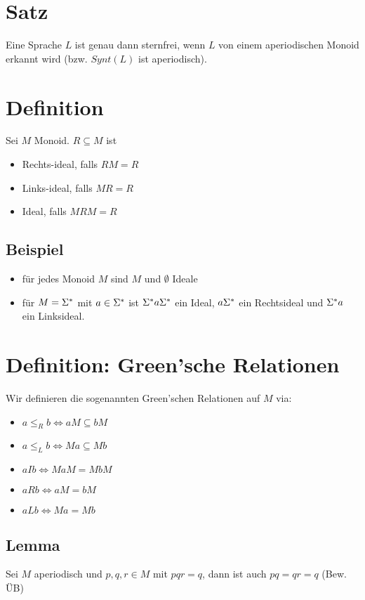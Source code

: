 \section{Satz}
    Eine Sprache $L$ ist genau dann sternfrei, wenn $L$ von einem aperiodischen Monoid erkannt wird (bzw. $Synt(L)$ ist aperiodisch).
\section{Definition}
    Sei $M$ Monoid. $R\subseteq M$ ist
    \begin{itemize}
        \item Rechts-ideal, falls $RM=R$
        \item Links-ideal, falls $MR=R$
        \item Ideal, falls $MRM=R$
    \end{itemize}
    \subsection{Beispiel}
        \begin{itemize}
            \item für jedes Monoid $M$ sind $M$ und $\emptyset$ Ideale
            \item für $M=\Sigma^*$ mit $a\in\Sigma^*$ ist $\Sigma^* a\Sigma^*$ ein Ideal, $a\Sigma^*$ ein Rechtsideal und $\Sigma^* a$ ein Linksideal.
        \end{itemize}
\section{Definition: Green'sche Relationen}
    Wir definieren die sogenannten Green'schen Relationen auf $M$ via:
    \begin{itemize}
        \item $a\le_R b\Leftrightarrow aM\subseteq bM$
        \item $a\le_L b\Leftrightarrow Ma\subseteq Mb$
        \item $aIb\Leftrightarrow MaM=MbM$
        \item $aRb\Leftrightarrow aM=bM$
        \item $aLb\Leftrightarrow Ma=Mb$
    \end{itemize}
    \subsection{Lemma}
        \label{sub:sch-lemma-1}
        Sei $M$ aperiodisch und $p,q,r\in M$ mit $pqr=q$, dann ist auch $pq=qr=q$ (Bew. ÜB)
